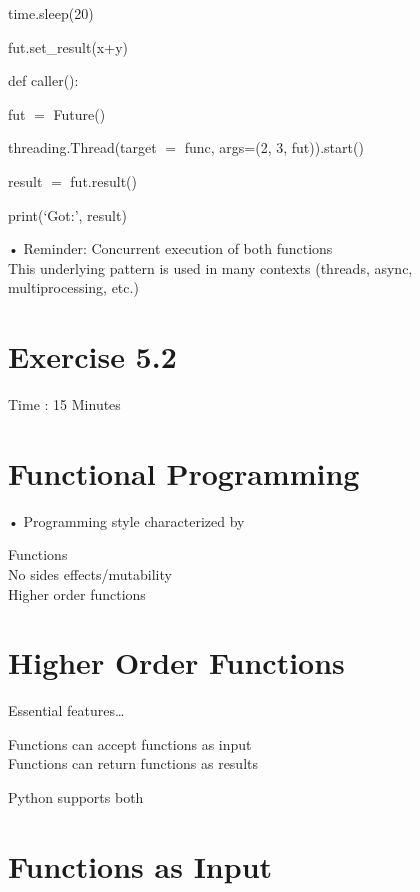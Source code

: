 \documentclass[
  letterpaper,
  DIV=11,
  numbers=noendperiod]{scrreprt}
\begin{document}
time.sleep(20)

fut.set\_result(x+y)

def caller():

fut \(=\) Future()

threading.Thread(target \(=\) func, args=(2, 3, fut)).start()

result \(=\) fut.result()

print(`Got:', result)

• Reminder: Concurrent execution of both functions\\
This underlying pattern is used in many contexts (threads, async,
multiprocessing, etc.)


\chapter{Exercise 5.2}\label{exercise-5.2}

Time : 15 Minutes


\chapter{Functional Programming}\label{functional-programming}

• Programming style characterized by

Functions\\
No sides effects/mutability\\
Higher order functions


\chapter{Higher Order Functions}\label{higher-order-functions}

Essential features\ldots{}

Functions can accept functions as input\\
Functions can return functions as results

Python supports both


\chapter{Functions as Input}\label{functions-as-input}
\end{document}
